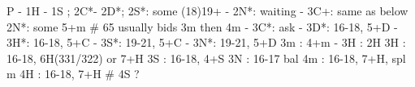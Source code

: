 P - 1H - 1S ; 2C*- 2D*; 
2S*: some (18)19+
   - 2N*: waiting
		- 3C+: same as below
2N*: some 5+m  # 65 usually bids 3m then 4m
   - 3C*: ask
		- 3D*: 16-18, 5+D
		- 3H*: 16-18, 5+C
		- 3S*: 19-21, 5+C
		- 3N*: 19-21, 5+D
3m : 4+m
   - 3H : 2H
3H : 16-18, 6H(331/322) or 7+H
3S : 16-18, 4+S
3N : 16-17 bal
4m : 16-18, 7+H, spl m
4H : 16-18, 7+H
# 4S ?
